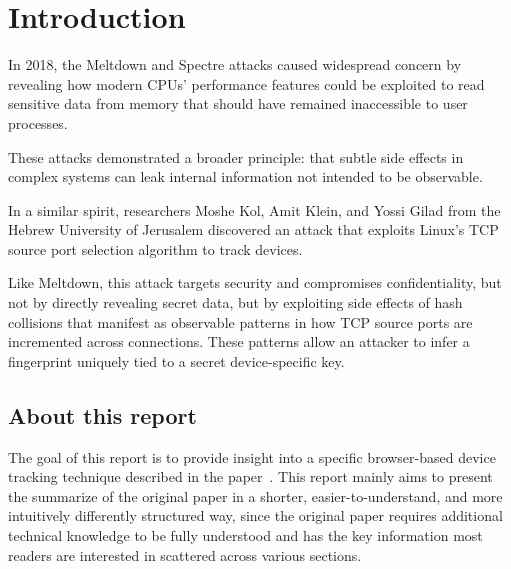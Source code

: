 \documentclass[twocolumn]{report}
\begin{document}
\fontsize{7pt}{8pt}\selectfont
{}



\clearpage
{}
\tableofcontents
\clearpage
\clearpage

\pagestyle{plain}
\clearpage

\section{Introduction}
\label{sec:introduction}

In 2018, the \alert{Meltdown} and \alert{Spectre} attacks caused widespread concern by revealing how modern CPUs’ performance features could be exploited to read sensitive data from memory that should have remained inaccessible to user processes.

These attacks demonstrated a broader principle: that subtle side effects in complex systems can leak internal information not intended to be observable.

In a similar spirit, researchers Moshe Kol, Amit Klein, and Yossi Gilad from the Hebrew University of Jerusalem discovered an attack that exploits Linux’s \alert{TCP source port selection algorithm} to track devices.

Like Meltdown, this attack targets \alert{security} and compromises confidentiality, but not by directly revealing secret data, but by exploiting side effects of \alert{hash collisions} that manifest as observable patterns in how \alert{TCP source ports} are incremented across connections. These patterns allow an attacker to infer a fingerprint uniquely tied to a \alert{secret device-specific key}.

\subsection{About this report}
\label{sec:goal_of_this_report}

The goal of this report is to provide insight into a specific browser-based device tracking technique described in the paper~\cite{kol2022devicetrackinglinuxsnew}. %
This report mainly aims to present the \alert{summarize} of the original paper in a \alert{shorter}, \alert{easier-to-understand}, and \alert{more intuitively differently structured way}, since the original paper requires additional technical knowledge to be fully understood and has the key information most readers are interested in scattered across various sections.
\end{document}
